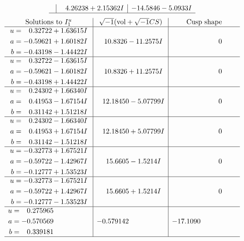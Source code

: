 \documentclass[1p]{elsarticle_modified}
\theoremstyle{definition}
\newcommand{\I}{\sqrt{-1}}
\begin{document}
$$\begin{array}{c|c|c}
 & \phantom{-}4.26238 + 2.15362 I & -14.5846 - 5.0933 I\\
 \hline 
 \end{array}$$\newpage$$\begin{array}{c|c|c}  
\text{Solutions to }I^u_{1}& \I (\text{vol} + \sqrt{-1}CS) & \text{Cusp shape}\\
 \hline 
\begin{aligned}
u &= \phantom{-}0.32722 + 1.63615 I \\
a &= -0.59621 + 1.60182 I \\
b &= -0.43198 - 1.44422 I\end{aligned}
 & \phantom{-}10.8326 - 11.2575 I & \phantom{-0.000000 } 0 \\ \hline\begin{aligned}
u &= \phantom{-}0.32722 - 1.63615 I \\
a &= -0.59621 - 1.60182 I \\
b &= -0.43198 + 1.44422 I\end{aligned}
 & \phantom{-}10.8326 + 11.2575 I & \phantom{-0.000000 } 0 \\ \hline\begin{aligned}
u &= \phantom{-}0.24302 + 1.66340 I \\
a &= \phantom{-}0.41953 - 1.67154 I \\
b &= \phantom{-}0.31142 + 1.51218 I\end{aligned}
 & \phantom{-}12.18450 - 5.07799 I & \phantom{-0.000000 } 0 \\ \hline\begin{aligned}
u &= \phantom{-}0.24302 - 1.66340 I \\
a &= \phantom{-}0.41953 + 1.67154 I \\
b &= \phantom{-}0.31142 - 1.51218 I\end{aligned}
 & \phantom{-}12.18450 + 5.07799 I & \phantom{-0.000000 } 0 \\ \hline\begin{aligned}
u &= -0.32773 + 1.67521 I \\
a &= -0.59722 - 1.42967 I \\
b &= -0.12777 + 1.53523 I\end{aligned}
 & \phantom{-}15.6605 - 1.5214 I & \phantom{-0.000000 } 0 \\ \hline\begin{aligned}
u &= -0.32773 - 1.67521 I \\
a &= -0.59722 + 1.42967 I \\
b &= -0.12777 - 1.53523 I\end{aligned}
 & \phantom{-}15.6605 + 1.5214 I & \phantom{-0.000000 } 0 \\ \hline\begin{aligned}
u &= \phantom{-}0.275965\phantom{ +0.000000I} \\
a &= -0.570569\phantom{ +0.000000I} \\
b &= \phantom{-}0.339181\phantom{ +0.000000I}\end{aligned}
 & -0.579142\phantom{ +0.000000I} & -17.1090\phantom{ +0.000000I}\\
 \hline 
 \end{array}$$\newpage\newpage\renewcommand{\arraystretch}{1}
\end{document}
